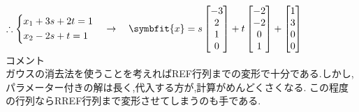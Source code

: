 \hspace{2cm}
$\therefore \begin{cases*}
    x_1 +3s+2t=1 \\
    x_2 -2s+t=1
\end{cases*}\quad \rightarrow \quad
\symbfit{x}=s
\begin{bmatrix}
    -3 \\ 2 \\ 1 \\ 0
\end{bmatrix}+t
\begin{bmatrix}
    -2 \\ -2 \\ 0 \\ 1
\end{bmatrix}+
\begin{bmatrix}
    1 \\ 3 \\ 0 \\ 0
\end{bmatrix}$\\
コメント\\
ガウスの消去法を使うことを考えればREF行列までの変形で十分である.しかし,パラメーター付きの解は長く,代入する方が,計算がめんどくさくなる.
この程度の行列ならRREF行列まで変形させてしまうのも手である.\\

